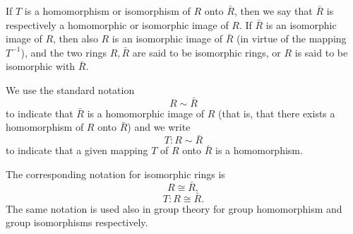 If $T$ is a homomorphism or isomorphism of $R$ onto $\bar{R}$, then we say that $\bar{R}$ is respectively a homomorphic or isomorphic image of $R$. If $\bar{R}$ is an isomorphic image of $R$, then also $R$ is an isomorphic image of $\bar{R}$ (in virtue of the mapping $T^{-1}$), and the two rings $R, \bar{R}$ are said to be isomorphic rings, or $R$ is said to be isomorphic with $\bar{R}$.

We use the standard notation
$$R \sim \bar{R}$$
to indicate that $\bar{R}$ is a homomorphic image of $R$ (that is, that there exists a homomorphism of $R$ onto $\bar{R}$) and we write
$$T: R \sim \bar{R}$$
to indicate that a given mapping $T$ of $R$ onto $\bar{R}$ is a homomorphism.

The corresponding notation for isomorphic rings is
$$R \cong \bar{R},$$
$$T: R \cong \bar{R}.$$
The same notation is used also in group theory for group homomorphism and group isomorphisms respectively.
